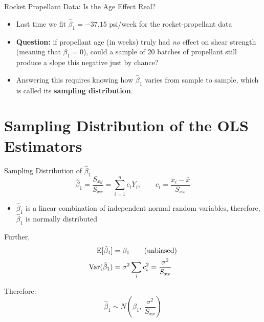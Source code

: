 \begin{frame}{Rocket Propellant Data: Is the Age Effect Real?}
	\begin{itemize}
		\item Last time we fit $\hat\beta_1 = -37.15$ psi/week for the rocket-propellant data
		\item[] \textbf{Question:} if propellant age (in weeks) truly had \emph{no} effect on shear strength (meaning that $\beta_1=0$), could a sample of 20 batches of propellant still produce a slope this negative just by chance?
	\end{itemize}
	\svspace{1em}
	\begin{itemize}
		\item Answering this requires knowing how $\hat\beta_1$ varies from sample to sample, which is called its \textbf{sampling distribution}.
	\end{itemize}
\end{frame}


\section{Sampling Distribution of the OLS Estimators}


\begin{frame}{Sampling Distribution of $\hat\beta_1$}
	\[
		\hat\beta_1 = \frac{S_{xy}}{S_{xx}} = \sum_{i=1}^n c_i Y_i, \qquad c_i=\frac{x_i-\bar x}{S_{xx}}
	\]

	\begin{itemize}
		\item $\hat\beta_1$ is a linear combination of independent normal random variables, therefore, $\hat\beta_1$ is normally distributed
	\end{itemize}

	\pause

	Further,
	\begin{align*}
		\operatorname{E}[\hat\beta_1] &= \beta_1 \qquad\text{(unbiased)}\\
		\operatorname{Var}(\hat\beta_1) &= \sigma^2\sum_i c_i^2 = \frac{\sigma^2}{S_{xx}}
	\end{align*}

	\pause
	Therefore:
	\[
		\hat\beta_1 \sim N\!\left(\beta_1,\ \frac{\sigma^2}{S_{xx}}\right)
	\]
\end{frame}



